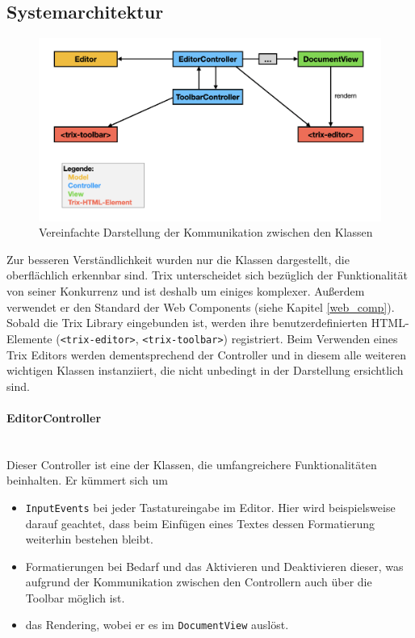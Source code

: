 \subsection{Systemarchitektur}
\begin{figure}[H]
\begin{center}
	\includegraphics[scale=.4]{images/sysarch.png}
\end{center}
	\caption{Vereinfachte Darstellung der Kommunikation zwischen den Klassen}
\end{figure}

Zur besseren Verständlichkeit wurden nur die Klassen dargestellt, die oberflächlich erkennbar sind. Trix unterscheidet sich bezüglich der Funktionalität von seiner Konkurrenz und ist deshalb um einiges komplexer. Außerdem verwendet er den Standard der Web Components (siehe Kapitel \ref{web_comp}). Sobald die Trix Library eingebunden ist, werden ihre benutzerdefinierten HTML-Elemente (\texttt{<trix-editor>}, \texttt{<trix-toolbar>}) registriert. Beim Verwenden eines Trix Editors werden dementsprechend der Controller und in diesem alle weiteren wichtigen Klassen instanziiert, die nicht unbedingt in der Darstellung ersichtlich sind. 

\paragraph{EditorController}\mbox{}\\
Dieser Controller ist eine der Klassen, die umfangreichere Funktionalitäten beinhalten. Er kümmert sich um 

\begin{itemize}
	\item \texttt{InputEvents} bei jeder Tastatureingabe im Editor. Hier wird beispielsweise darauf geachtet, dass beim Einfügen eines Textes dessen Formatierung weiterhin bestehen bleibt.
	\item Formatierungen bei Bedarf und das Aktivieren und Deaktivieren dieser, was aufgrund der Kommunikation zwischen den Controllern auch über die Toolbar möglich ist.
	\item das Rendering, wobei er es im \texttt{DocumentView} auslöst.
\end{itemize}

